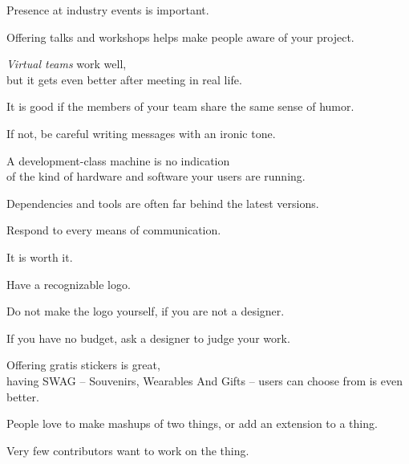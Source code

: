 \documentclass[t,handout,aspectratio=169]{beamer}
\begin{document}
\begin{frame}[fragile]%
    \vfill
    Presence at industry events is important. \pause

    Offering talks and workshops helps make people aware of your project.
\end{frame}

\begin{frame}[fragile]%
    \vfill
    \textit{Virtual teams} work well, \pause \\
    but it gets even better after meeting in real life.
\end{frame}

\begin{frame}[fragile]%
    \vfill
    It is good if the members of your team share the same sense of humor. \pause

    If not, be careful writing messages with an ironic tone.
\end{frame}

\begin{frame}[fragile]%
    \vfill
    A development-class machine is no indication \\
    of the kind of hardware and software your users are running. \pause

    Dependencies and tools are often far behind the latest versions.
\end{frame}

\begin{frame}[fragile]%
    \vfill
    Respond to every means of communication.

    It is worth it.
\end{frame}

\begin{frame}[fragile]%
    \vfill
    Have a recognizable logo. \pause

    Do not make the logo yourself, if you are not a designer. \pause

    If you have no budget, ask a designer to judge your work.
\end{frame}

\begin{frame}[fragile]%
    \vfill
    Offering gratis stickers is great, \pause \\
    having SWAG -- Souvenirs, Wearables And Gifts -- users can choose from is even better.
\end{frame}

\begin{frame}[fragile]%
    \vfill
    People love to make mashups of two things, or add an extension to a thing. \pause

    Very few contributors want to work on the thing.
\end{frame}
\end{document}
